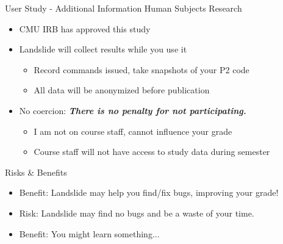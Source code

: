 \documentclass[xcolor=dvipsnames]{beamer}
\begin{document}
\begin{frame}{User Study - Additional Information}
	Human Subjects Research
	\begin{itemize}
		\item CMU IRB has approved this study
		\item Landslide will collect results while you use it
		\begin{itemize}
			\item Record commands issued, take snapshots of your P2 code
			\item All data will be anonymized before publication
		\end{itemize}
		\item No coercion: {\bf \em There is no penalty for not participating.}
		\begin{itemize}
			\item I am not on course staff, cannot influence your grade
			\item Course staff will not have access to study data during semester
		\end{itemize}
	\end{itemize}
	\pause
	\linegap

	Risks \& Benefits
	\begin{itemize}
		\item Benefit: Landslide may help you find/fix bugs, improving your grade!
		\item Risk: Landslide may find no bugs and be a waste of your time.
		\item Benefit: You might learn something...
	\end{itemize}
\end{frame}
\end{document}
